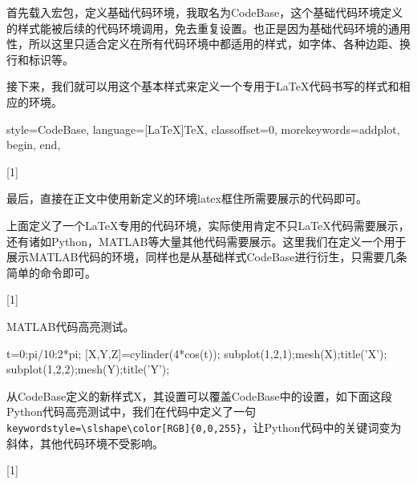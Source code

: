 首先载入宏包，定义基础代码环境，我取名为CodeBase，这个基础代码环境定义的样式能被后续的代码环境调用，免去重复设置。也正是因为基础代码环境的通用性，所以这里只适合定义在所有代码环境中都适用的样式，如字体、各种边距、换行和标识等。

\begin{latex}

\end{latex}

接下来，我们就可以用这个基本样式来定义一个专用于\LaTeX{}代码书写的样式和相应的环境。

\begin{latex}
{
    style=CodeBase,
    language=[LaTeX]TeX,
    classoffset=0,
    morekeywords={addplot, begin, end},
}

[1]{\lstset{style=LaTeX}}{}
\end{latex}

最后，直接在正文中使用新定义的环境latex框住所需要展示的代码即可。

上面定义了一个\LaTeX{}专用的代码环境，实际使用肯定不只\LaTeX{}代码需要展示，还有诸如Python，MATLAB等大量其他代码需要展示。这里我们在定义一个用于展示MATLAB代码的环境，同样也是从基础样式CodeBase进行衍生，只需要几条简单的命令即可。

\begin{latex}

[1]{\lstset{style=Matlab}}{}
\end{latex}

MATLAB代码高亮测试。

\begin{matlab}
t=0:pi/10:2*pi;
[X,Y,Z]=cylinder(4*cos(t));
subplot(1,2,1);mesh(X);title('X');
subplot(1,2,2);mesh(Y);title('Y');
\end{matlab}

从CodeBase定义的新样式X，其设置可以覆盖CodeBase中的设置，如下面这段Python代码高亮测试中，我们在代码中定义了一句\lstinline|keywordstyle=\slshape\color[RGB]{0,0,255}|，让Python代码中的关键词变为斜体，其他代码环境不受影响。

\begin{latex}
[1]{\lstset{style=python}}{}
\end{latex}


